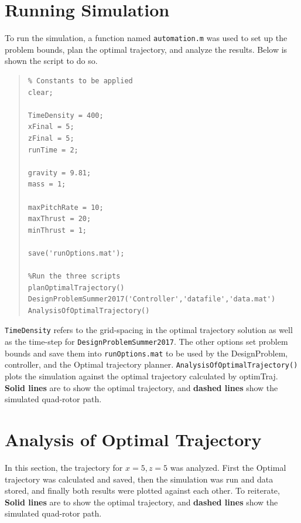 \documentclass[12pt]{article}
\begin{document}
\section{Running Simulation}\label{Running Simulation}

To run the simulation, a function named \lstinline!automation.m! was used to set up the problem bounds, plan the optimal trajectory, and analyze the results. Below is shown the script to do so.
\begin{quote}
\begin{lstlisting}
% Constants to be applied
clear; 

TimeDensity = 400;
xFinal = 5;
zFinal = 5;
runTime = 2;

gravity = 9.81;
mass = 1;

maxPitchRate = 10;
maxThrust = 20;
minThrust = 1;

save('runOptions.mat');

%Run the three scripts
planOptimalTrajectory()
DesignProblemSummer2017('Controller','datafile','data.mat')
AnalysisOfOptimalTrajectory()

\end{lstlisting}
\end{quote}
\lstinline!TimeDensity! refers to the grid-spacing in the optimal trajectory solution as well as the time-step for \lstinline!DesignProblemSummer2017!. The other options set problem bounds and save them into \lstinline!runOptions.mat! to be used by the DesignProblem, controller, and the Optimal trajectory planner. 
\newline
\newline
\lstinline!AnalysisOfOptimalTrajectory()! plots the simulation against the optimal trajectory calculated by optimTraj. \textbf{Solid lines} are to show the optimal trajectory, and \textbf{dashed lines} show the simulated quad-rotor path.
\section{Analysis of Optimal Trajectory}

In this section, the trajectory for $x=5,z=5$ was analyzed. First the Optimal trajectory was calculated and saved, then the simulation was run and data stored, and finally both results were plotted against each other. To reiterate, \textbf{Solid lines} are to show the optimal trajectory, and \textbf{dashed lines} show the simulated quad-rotor path.
\end{document}

